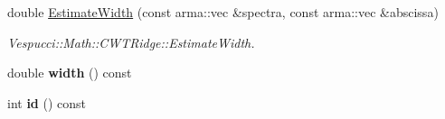 \begin{DoxyCompactItemize}
\item 
double \hyperlink{class_vespucci_1_1_math_1_1_c_w_t_ridge_ad0a6531d97ab3ad6f6e38e0697f98c90}{Estimate\+Width} (const arma\+::vec \&spectra, const arma\+::vec \&abscissa)
\begin{DoxyCompactList}\small\item\em Vespucci\+::\+Math\+::\+C\+W\+T\+Ridge\+::\+Estimate\+Width. \end{DoxyCompactList}\item 
\hypertarget{class_vespucci_1_1_math_1_1_c_w_t_ridge_a74e00a8554f54c0a2e36f5fde88be0fe}{double {\bfseries width} () const }\label{class_vespucci_1_1_math_1_1_c_w_t_ridge_a74e00a8554f54c0a2e36f5fde88be0fe}

\item 
\hypertarget{class_vespucci_1_1_math_1_1_c_w_t_ridge_a60f49549bf8dc49ae5d789c86ab853c8}{int {\bfseries id} () const }\label{class_vespucci_1_1_math_1_1_c_w_t_ridge_a60f49549bf8dc49ae5d789c86ab853c8}


\end{DoxyCompactItemize}
